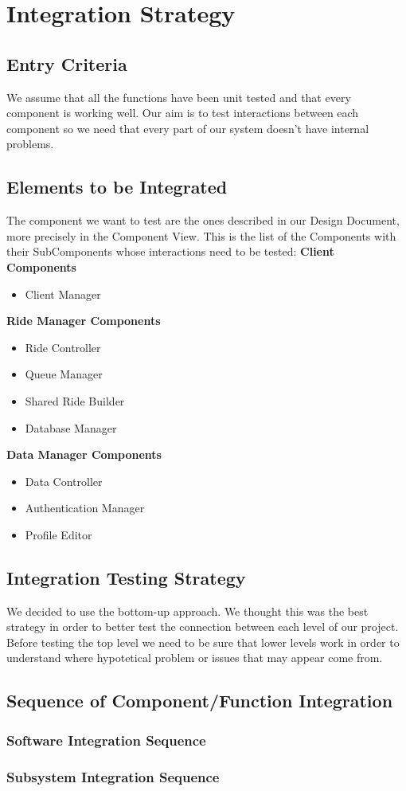 \section{Integration Strategy}
\subsection{Entry Criteria}
We assume that all the functions have been unit tested and that every component is working well. Our aim is to test interactions between each component so we need that every part of our system doesn't have internal problems.
\subsection{Elements to be Integrated}
The component we want to test are the ones described in our Design Document, more precisely in the Component View.\newline
This is the list of the Components with their SubComponents whose interactions need to be tested: \newline
\newline
\textbf{Client Components}
\begin {itemize}
\item Client Manager
\end {itemize}
\textbf{Ride Manager Components}
\begin{itemize}
\item Ride Controller
\item Queue Manager
\item Shared Ride Builder
\item Database Manager
\end {itemize}
\textbf{Data Manager Components}
\begin {itemize}
\item Data Controller
\item Authentication Manager
\item Profile Editor
\end{itemize}
\subsection{Integration Testing Strategy}
We decided to use the bottom-up approach. We thought this was the best strategy in order to better test the connection between each level of our project. Before testing the top level we need to be sure that lower levels work in order to understand where hypotetical problem or issues that may appear come from.
\subsection{Sequence of Component/Function Integration}
\subsubsection{Software Integration Sequence}
\subsubsection{Subsystem Integration Sequence}